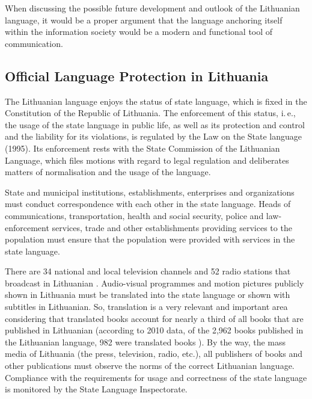 \begin{multicols}{2}
When discussing the possible future development and outlook of the Lithuanian language, it would be a proper argument that the language anchoring itself within the information society would be a modern and functional tool of communication.

\subsection{Official Language Protection in Lithuania}

The Lithuanian language enjoys the status of state language, which is fixed in the Constitution of the Republic of Lithuania. The enforcement of this status, i.\,e., the usage of the state language in public life, as well as its protection and control and the liability for its violations, is regulated by the Law on the State language (1995). Its enforcement rests with the State Commission of the Lithuanian Language, which files motions with regard to legal regulation and deliberates matters of normalisation and the usage of the language. 

    State and municipal institutions, establishments, enterprises and organizations must conduct correspondence with each other in the state language. Heads of communications, transportation, health and social security, police and law-enforcement services, trade and other establishments providing services to the population must ensure that the population were provided with services in the state language. 


There are 34 national and local television channels and 52 radio stations that broadcast in Lithuanian \cite{ldrt}. Audio-visual programmes and motion pictures publicly shown in Lithuania must be translated into the state language or shown with subtitles in Lithuanian. So, translation is a very relevant and important area considering that translated books account for nearly a third of all books that are published in Lithuanian (according to 2010 data, of the 2,962 books published in the Lithuanian language, 982 were translated books \cite{bbsc}).  By the way, the mass media of Lithuania (the press, television, radio, etc.), all publishers of books and other publications must observe the norms of the correct Lithuanian language. Compliance with the requirements for usage and correctness of the state language is monitored by the State Language Inspectorate.


\end{multicols}
